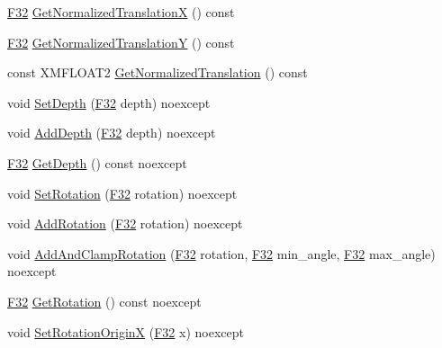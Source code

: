 \begin{DoxyCompactItemize}
\item 
\hyperlink{namespacemage_aa97e833b45f06d60a0a9c4fc22ae02c0}{F32} \hyperlink{classmage_1_1_sprite_transform_a31bf43cccaf564054930d80e229ebef3}{Get\+Normalized\+TranslationX} () const
\item 
\hyperlink{namespacemage_aa97e833b45f06d60a0a9c4fc22ae02c0}{F32} \hyperlink{classmage_1_1_sprite_transform_a6c5685c5d45391c6d5d820677b58c976}{Get\+Normalized\+TranslationY} () const
\item 
const X\+M\+F\+L\+O\+A\+T2 \hyperlink{classmage_1_1_sprite_transform_a35b4a512d853e08743948f8065d1558f}{Get\+Normalized\+Translation} () const
\item 
void \hyperlink{classmage_1_1_sprite_transform_a99da2aa3c134db3f4a72660befe1ca9a}{Set\+Depth} (\hyperlink{namespacemage_aa97e833b45f06d60a0a9c4fc22ae02c0}{F32} depth) noexcept
\item 
void \hyperlink{classmage_1_1_sprite_transform_a38ba3e38c4397f536e7c1998ef91d3d0}{Add\+Depth} (\hyperlink{namespacemage_aa97e833b45f06d60a0a9c4fc22ae02c0}{F32} depth) noexcept
\item 
\hyperlink{namespacemage_aa97e833b45f06d60a0a9c4fc22ae02c0}{F32} \hyperlink{classmage_1_1_sprite_transform_acbb61149d34be717c43a78fc9113fe9c}{Get\+Depth} () const noexcept
\item 
void \hyperlink{classmage_1_1_sprite_transform_aa5e9162146729dd579e2409e348eafa2}{Set\+Rotation} (\hyperlink{namespacemage_aa97e833b45f06d60a0a9c4fc22ae02c0}{F32} rotation) noexcept
\item 
void \hyperlink{classmage_1_1_sprite_transform_ab189a29372631e74ae5f638243eaa312}{Add\+Rotation} (\hyperlink{namespacemage_aa97e833b45f06d60a0a9c4fc22ae02c0}{F32} rotation) noexcept
\item 
void \hyperlink{classmage_1_1_sprite_transform_a29d41f069bb02f46bae495d1e9a19c9b}{Add\+And\+Clamp\+Rotation} (\hyperlink{namespacemage_aa97e833b45f06d60a0a9c4fc22ae02c0}{F32} rotation, \hyperlink{namespacemage_aa97e833b45f06d60a0a9c4fc22ae02c0}{F32} min\+\_\+angle, \hyperlink{namespacemage_aa97e833b45f06d60a0a9c4fc22ae02c0}{F32} max\+\_\+angle) noexcept
\item 
\hyperlink{namespacemage_aa97e833b45f06d60a0a9c4fc22ae02c0}{F32} \hyperlink{classmage_1_1_sprite_transform_ae7fc2e36ce99ea41a74d53032437dd58}{Get\+Rotation} () const noexcept
\item 
void \hyperlink{classmage_1_1_sprite_transform_a1928602ce38aa2ebf26becd93c875dc5}{Set\+Rotation\+OriginX} (\hyperlink{namespacemage_aa97e833b45f06d60a0a9c4fc22ae02c0}{F32} x) noexcept

\end{DoxyCompactItemize}
